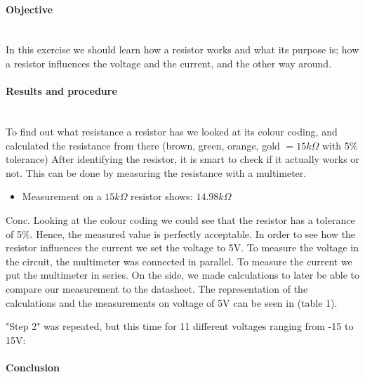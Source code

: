 \paragraph*{Objective} \hfill \\
In this exercise we should learn how a resistor works and what its purpose is; how a resistor influences the voltage and the current, and the other way around.

\paragraph*{Results and procedure} \hfill\\
To find out what resistance a resistor has we looked at its colour coding, and calculated the resistance from there (brown, green, orange, gold $= 15k\Omega$ with 5\% tolerance) After identifying the resistor, it is smart to check if it actually works or not. This can be done by measuring the resistance with a multimeter.  
\begin{itemize}
\item Measurement on a $15k\Omega$ resistor shows: $14.98 k\Omega$
\end{itemize}
Conc. Looking at the colour coding we could see that the resistor has a tolerance of 5\%. Hence, the measured value is perfectly acceptable. In order to see how the resistor influences the current we set the voltage to 5V. To measure the voltage in the circuit, the multimeter was connected in parallel. To measure the current we put the multimeter in series. On the side, we made calculations to later be able to compare our measurement to the datasheet. The representation of the calculations and the measurements on voltage of 5V can be seen in (table 1).
\par "Step 2" was repeated, but this time for 11 different voltages ranging from -15 to 15V:

\paragraph*{Conclusion} \hfill \\